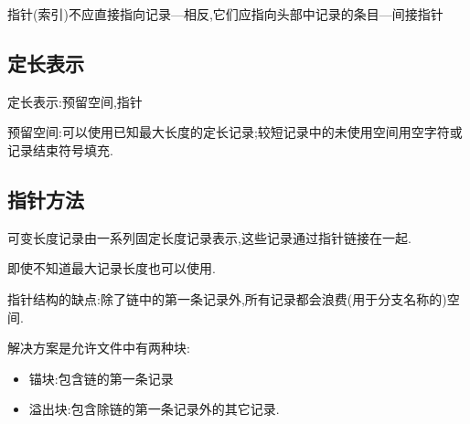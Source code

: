 指针(索引)不应直接指向记录---相反,它们应指向头部中记录的条目---间接指针


\subsection{定长表示}

定长表示:预留空间,指针

预留空间:可以使用已知最大长度的定长记录;较短记录中的未使用空间用空字符或记录结束符号填充.

\subsection{指针方法}

可变长度记录由一系列固定长度记录表示,这些记录通过指针链接在一起.

即使不知道最大记录长度也可以使用.

指针结构的缺点:除了链中的第一条记录外,所有记录都会浪费(用于分支名称的)空间.

解决方案是允许文件中有两种块:

\begin{itemize}
    \item 锚块:包含链的第一条记录
    \item 溢出块:包含除链的第一条记录外的其它记录.
\end{itemize}